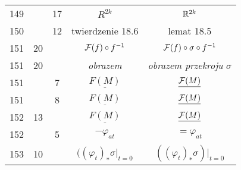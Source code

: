 \documentclass[a4paper,11pt]{article}
\begin{document}
\begin{center}
\begin{tabular}{|c|c|c|c|c|}
    149 & & 17 & $R^{ 2k }$ & $\mathbb{R}^{ 2k }$ \\
    150 & & 12 & twierdzenie 18.6 & lemat 18.5 \\
    151 & 20 & & $\mathcal{F}( f ) \circ f^{ -1 }$
           & $\mathcal{F}( f ) \circ \sigma \circ f^{ -1 }$ \\
    151 & 20 & & \textit{obrazem} & \textit{obrazem przekroju} $\sigma$ \\
    151 & & \hphantom{0}7 & $\underline{ F( M ) }$
    & $\underline{ \mathcal{F}( M ) }$ \\
    151 & & \hphantom{0}8 & $\underline{ F( M ) }$
           & $\underline{ \mathcal{F}( M ) }$ \\
    152 & 13 & & $\underline{ F( M ) }$ & $\underline{ \mathcal{F}( M ) }$ \\
    152 & & \hphantom{0}5 & $-\varphi_{ a t }$ & $= \varphi_{ a t }$ \\
    153 & 10 & & $( ( \varphi_{ t } )_{ * } \sigma \bigg|_{ t = 0 }$
           & $( ( \varphi_{ t } )_{ * } \sigma )\bigg|_{ t = 0 }$ \\
    \hline
  \end{tabular}





  \newpage


\end{center}
\end{document}
